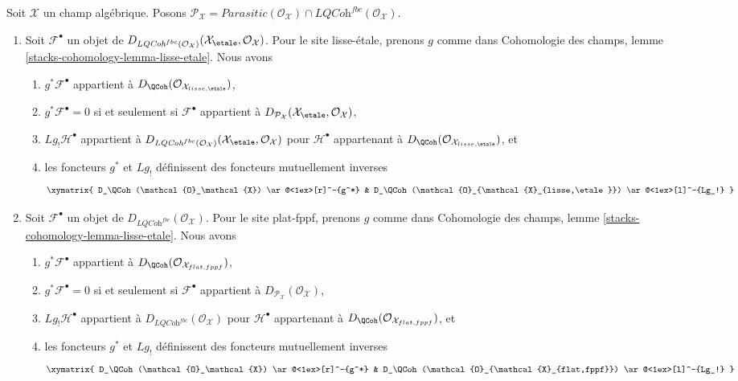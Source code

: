 \begin{lemma}
\label{lemma-derived-quasi-coherent}
Soit $\mathcal{X}$ un champ algébrique. Posons
$\mathcal{P}_\mathcal{X} = \textit{Parasitic}(\mathcal{O}_\mathcal{X}) \cap
\textit{LQCoh}^{fbc}(\mathcal{O}_\mathcal{X})$.
\begin{enumerate}
\item
Soit $\mathcal{F}^\bullet$ un objet de
$D_{\textit{LQCoh}^{fbc}(\mathcal{O}_\mathcal{X})}
(\mathcal{X}_\etale, \mathcal{O}_\mathcal{X})$.
Pour le site lisse-\'etale, prenons $g$ comme dans Cohomologie des champs,
lemme \ref{stacks-cohomology-lemma-lisse-etale}. Nous avons
\begin{enumerate}
\item $g^*\mathcal{F}^\bullet$ appartient à
$D_\QCoh(\mathcal{O}_{\mathcal{X}_{lisse,\etale}})$,
\item $g^*\mathcal{F}^\bullet = 0$ si et seulement si
$\mathcal{F}^\bullet$ appartient à
$D_{\mathcal{P}_\mathcal{X}}(\mathcal{X}_\etale, \mathcal{O}_\mathcal{X})$,
\item $Lg_!\mathcal{H}^\bullet$ appartient à
$D_{\textit{LQCoh}^{fbc}(\mathcal{O}_\mathcal{X})}(
\mathcal{X}_\etale, \mathcal{O}_\mathcal{X})$
pour $\mathcal{H}^\bullet$ appartenant à
$D_\QCoh(\mathcal{O}_{\mathcal{X}_{lisse,\etale}})$, et
\item les foncteurs $g^*$ et $Lg_!$ définissent des foncteurs mutuellement
inverses
$$
\xymatrix{
D_\QCoh(\mathcal{O}_\mathcal{X}) \ar@<1ex>[r]^-{g^*} &
D_\QCoh(\mathcal{O}_{\mathcal{X}_{lisse,\etale}})
\ar@<1ex>[l]^-{Lg_!}
}
$$
\end{enumerate}
\item
Soit $\mathcal{F}^\bullet$ un objet de
$D_{\textit{LQCoh}^{fbc}}(\mathcal{O}_\mathcal{X})$. Pour le site plat-fppf,
prenons $g$ comme dans Cohomologie des champs, lemme
\ref{stacks-cohomology-lemma-lisse-etale}. Nous avons
\begin{enumerate}
\item $g^*\mathcal{F}^\bullet$ appartient à
$D_\QCoh(\mathcal{O}_{\mathcal{X}_{flat, fppf}})$,
\item $g^*\mathcal{F}^\bullet = 0$ si et seulement si
$\mathcal{F}^\bullet$ appartient à
$D_{\mathcal{P}_\mathcal{X}}(\mathcal{O}_\mathcal{X})$,
\item $Lg_!\mathcal{H}^\bullet$ appartient à
$D_{\textit{LQCoh}^{fbc}}(\mathcal{O}_\mathcal{X})$
pour $\mathcal{H}^\bullet$ appartenant à
$D_\QCoh(\mathcal{O}_{\mathcal{X}_{flat,fppf}})$, et
\item les foncteurs $g^*$ et $Lg_!$ définissent des foncteurs mutuellement
inverses
$$
\xymatrix{
D_\QCoh(\mathcal{O}_\mathcal{X}) \ar@<1ex>[r]^-{g^*} &
D_\QCoh(\mathcal{O}_{\mathcal{X}_{flat,fppf}}) \ar@<1ex>[l]^-{Lg_!}
}
$$
\end{enumerate}
\end{enumerate}
\end{lemma}

